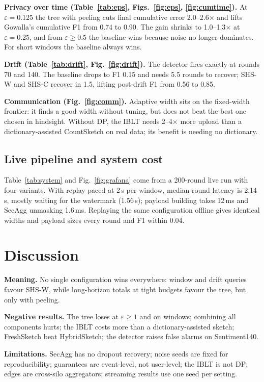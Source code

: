 \documentclass[conference]{IEEEtran}
\newcommand{\eps}{\varepsilon}
\begin{document}
\textbf{Privacy over time (Table~\ref{tab:eps}, Figs.~\ref{fig:eps}, \ref{fig:cumtime}).} At $\eps=0.125$ the tree with peeling
cuts final cumulative error 2.0--2.6$\times$ and lifts Gowalla's cumulative F1 from 0.74 to 0.90. The gain shrinks to
1.0--1.3$\times$ at $\eps=0.25$, and from $\eps\ge0.5$ the baseline wins because noise no longer dominates. For short windows
the baseline always wins.

\textbf{Drift (Table~\ref{tab:drift}, Fig.~\ref{fig:drift}).} The detector fires exactly at rounds 70 and 140. The baseline
drops to F1 0.15 and needs 5.5 rounds to recover; SHS-W and SHS-C recover in 1.5, lifting post-drift F1 from 0.56 to 0.85.

\textbf{Communication (Fig.~\ref{fig:comm}).} Adaptive width sits on the fixed-width frontier: it finds a good width without
tuning, but does not beat the best one chosen in hindsight. Without DP, the IBLT needs 2--4$\times$ more upload than a
dictionary-assisted CountSketch on real data; its benefit is needing no dictionary.

\subsection{Live pipeline and system cost}
Table~\ref{tab:system} and Fig.~\ref{fig:grafana} come from a 200-round live run with four variants. With replay paced at
2\,s per window, median round latency is 2.14\,s, mostly waiting for the watermark (1.56\,s); payload building takes 12\,ms and
SecAgg unmasking 1.6\,ms. Replaying the same configuration offline gives identical widths and payload sizes every round
and F1 within 0.04.

\section{Discussion}
\textbf{Meaning.} No single configuration wins everywhere: window and drift queries favour SHS-W, while long-horizon
totals at tight budgets favour the tree, but only with peeling.

\textbf{Negative results.} The tree loses at $\eps\ge1$ and on windows; combining all components hurts; the IBLT costs more
than a dictionary-assisted sketch; FreshSketch beat HybridSketch; the detector raises false alarms on Sentiment140.

\textbf{Limitations.} SecAgg has no dropout recovery; noise seeds are fixed for reproducibility; guarantees are
event-level, not user-level; the IBLT is not DP; edges are cross-silo aggregators; streaming results use one seed per setting.
\end{document}

